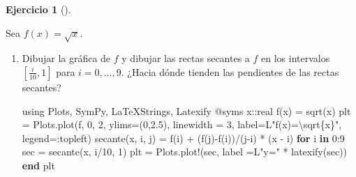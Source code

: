 \documentclass[
  a4paper,
]{scrreport}
\newenvironment{Shaded}{\begin{snugshade}}{\end{snugshade}}
\newcommand{\BuiltInTok}[1]{\textcolor[rgb]{0.00,0.23,0.31}{#1}}
\newcommand{\ControlFlowTok}[1]{\textcolor[rgb]{0.00,0.23,0.31}{\textbf{#1}}}
\newcommand{\DataTypeTok}[1]{\textcolor[rgb]{0.68,0.00,0.00}{#1}}
\newcommand{\FloatTok}[1]{\textcolor[rgb]{0.68,0.00,0.00}{#1}}
\newcommand{\FunctionTok}[1]{\textcolor[rgb]{0.28,0.35,0.67}{#1}}
\newcommand{\ImportTok}[1]{\textcolor[rgb]{0.00,0.46,0.62}{#1}}
\newcommand{\KeywordTok}[1]{\textcolor[rgb]{0.00,0.23,0.31}{\textbf{#1}}}
\newcommand{\NormalTok}[1]{\textcolor[rgb]{0.00,0.23,0.31}{#1}}
\newcommand{\OperatorTok}[1]{\textcolor[rgb]{0.37,0.37,0.37}{#1}}
\newcommand{\PreprocessorTok}[1]{\textcolor[rgb]{0.68,0.00,0.00}{#1}}
\newcommand{\StringTok}[1]{\textcolor[rgb]{0.13,0.47,0.30}{#1}}
\theoremstyle{definition}
\newtheorem{exercise}{Ejercicio}[chapter]
\theoremstyle{remark}
\begin{document}
\begin{exercise}[]\protect\hypertarget{exr-secantes-tangente}{}\label{exr-secantes-tangente}

Sea \(f(x)=\sqrt{x}\).

\begin{enumerate}
\def\labelenumi{\alph{enumi}.}
\item
  Dibujar la gráfica de \(f\) y dibujar las rectas secantes a \(f\) en
  los intervalos \([\frac{i}{10}, 1]\) para \(i=0,\ldots, 9\). ¿Hacia
  dónde tienden las pendientes de las rectas secantes?

  \begin{tcolorbox}[enhanced jigsaw, bottomtitle=1mm, rightrule=.15mm, left=2mm, colback=white, title=\textcolor{quarto-callout-tip-color}{\faLightbulb}\hspace{0.5em}{Solución}, bottomrule=.15mm, colframe=quarto-callout-tip-color-frame, toprule=.15mm, leftrule=.75mm, opacityback=0, coltitle=black, breakable, colbacktitle=quarto-callout-tip-color!10!white, arc=.35mm, toptitle=1mm, titlerule=0mm, opacitybacktitle=0.6]

\begin{Shaded}
\begin{Highlighting}[]
\ImportTok{using} \BuiltInTok{Plots}\NormalTok{, }\BuiltInTok{SymPy}\NormalTok{, }\BuiltInTok{LaTeXStrings}\NormalTok{, }\BuiltInTok{Latexify}
\PreprocessorTok{@syms}\NormalTok{ x}\OperatorTok{::}\DataTypeTok{real}
\FunctionTok{f}\NormalTok{(x) }\OperatorTok{=} \FunctionTok{sqrt}\NormalTok{(x)}
\NormalTok{plt }\OperatorTok{=}\NormalTok{ Plots.}\FunctionTok{plot}\NormalTok{(f, }\FloatTok{0}\NormalTok{, }\FloatTok{2}\NormalTok{, ylims}\OperatorTok{=}\NormalTok{(}\FloatTok{0}\NormalTok{,}\FloatTok{2.5}\NormalTok{), linewidth }\OperatorTok{=} \FloatTok{3}\NormalTok{, label}\OperatorTok{=}\NormalTok{L}\StringTok{"f(x)=\textbackslash{}sqrt\{x\}"}\NormalTok{, legend}\OperatorTok{=:}\NormalTok{topleft)}
\FunctionTok{secante}\NormalTok{(x, i, j) }\OperatorTok{=} \FunctionTok{f}\NormalTok{(i) }\OperatorTok{+}\NormalTok{ (}\FunctionTok{f}\NormalTok{(j)}\FunctionTok{{-}f}\NormalTok{(i))}\OperatorTok{/}\NormalTok{(j}\OperatorTok{{-}}\NormalTok{i) }\OperatorTok{*}\NormalTok{ (x }\OperatorTok{{-}}\NormalTok{ i)}
\ControlFlowTok{for}\NormalTok{ i }\KeywordTok{in} \FloatTok{0}\OperatorTok{:}\FloatTok{9}
\NormalTok{    sec }\OperatorTok{=} \FunctionTok{secante}\NormalTok{(x, i}\OperatorTok{/}\FloatTok{10}\NormalTok{, }\FloatTok{1}\NormalTok{)}
\NormalTok{    plt }\OperatorTok{=}\NormalTok{ Plots.}\FunctionTok{plot!}\NormalTok{(sec, label }\OperatorTok{=}\NormalTok{L}\StringTok{"y="} \OperatorTok{*} \FunctionTok{latexify}\NormalTok{(sec))}
\ControlFlowTok{end}
\NormalTok{plt}
\end{Highlighting}
\end{Shaded}


\end{tcolorbox}
\end{enumerate}
\end{exercise}
\end{document}
